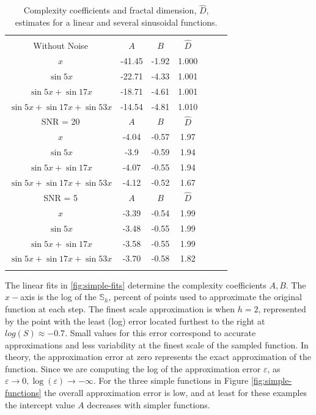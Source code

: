 \begin{table}[!htbp] \centering 
\begin{tabular}{@{\extracolsep{1pt}} ccccccc} 
\\[-1.8ex]\hline 
\hline \\[-1.8ex] 
Without Noise     &  $A$ & $B$  & $\hat D$ \\ \hline 
        $x $    &    -41.45 & -1.92  & 1.000\\ 
 $\sin 5x$  &
                  -22.71 & -4.33 & 1.001 \\ 
 $\sin 5x  + \sin 17x$ &
                  -18.71 & -4.61 & 1.001 \\ 
 $\sin 5x  + \sin 17x + \sin 53x $ &
                  -14.54 & -4.81 & 1.010 
 \\ \hline  
%    
SNR = 20  & $A$ & $B$ & $\hat D$ \\  \hline
$x  $ &
   -4.04  & -0.57   &  1.97 \\  
 $\sin 5x   $ &  
   -3.9  & -0.59   &  1.94 \\  
 $\sin 5x  + \sin 17x  $ &
   -4.07  & -0.55   &  1.94 \\  
$\sin 5x  + \sin 17x + \sin 53x $ & 
   -4.12  & -0.52   &  1.67 
\\ \hline 
SNR = 5    & $A$ & $B$& $\hat D$  \\ \hline
$ x$ &
 -3.39 & -0.54   &  1.99  \\ 
 $\sin 5x $ &
 -3.48 & -0.55   &  1.99  \\ 
 $\sin 5x  + \sin 17x $ &
 -3.58 & -0.55   &  1.99  \\ 
 $\sin 5x  + \sin 17x + \sin 53x $ &
 -3.70 & -0.58   &  1.82  \\
 \hline \\[-1.8ex] 
    \end{tabular}
  \caption{Complexity coefficients and fractal dimension, $\hat D$,
  estimates for a linear and several sinusoidal functions.}\label{tab:simple-coeffs}  
\end{table}

The linear fits in \ref{fig:simple-fits} determine the complexity 
coefficients $A,B$. The $x-$axis is the log of the  $\mathbb{S}_h$, percent of points used to approximate the original function at each step. The finest scale approximation is when $h=2$, represented by the point with the least (log) error located furthest to the right at $log( S )\approx -0.7$. Small values for this error correspond to accurate approximations and less variability at the finest scale of the sampled function. 
In theory, the approximation error at zero represents the exact approximation of the function. Since we are computing the log of the approximation error $\varepsilon$, as 
$\varepsilon \to 0, \log(\varepsilon) \to -\infty$. For 
the three simple functions in Figure \ref{fig:simple-functions}
the overall approximation error is low, and at least for these
examples the intercept value $A$ decreases with simpler 
functions.

